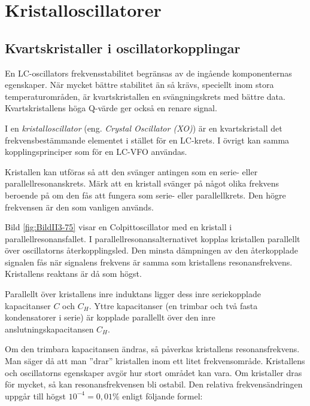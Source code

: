 \section{Kristalloscillatorer}

\subsection{Kvartskristaller i oscillator\-kopplingar}

En LC-oscillators frekvensstabilitet begränsas av de ingående
komponenternas egenskaper.
När mycket bättre stabilitet än så krävs, speciellt inom stora
temperaturområden, är kvartskristallen en svängningskrets med bättre data.
Kvartskristallens höga Q-värde ger också en renare signal.


I en \emph{kristalloscillator} (eng. \emph{Crystal Oscillator (XO)}) är en
kvartskristall det frekvensbestämmande elementet i stället för en LC-krets.
I övrigt kan samma kopplingsprinciper som för en LC-VFO användas.

Kristallen kan utföras så att den svänger antingen som en serie- eller
parallellresonanskrets.
Märk att en kristall svänger på något olika frekvens beroende på om den fås
att fungera som serie- eller parallellkrets.
Den högre frekvensen är den som vanligen används.

Bild \ref{fig:BildII3-75} visar en Colpittoscillator med en kristall i
parallellresonansfallet.
I parallellresonansalternativet kopplas kristallen parallellt över
oscillatorns återkopplingsled.
Den minsta dämpningen av den återkopplade signalen fås när signalens frekvens
är samma som kristallens resonansfrekvens.
Kristallens reaktans är då som högst.

Parallellt över kristallens inre induktans ligger dess inre
seriekopplade kapacitanser \(C\) och \(C_H\).
Yttre kapacitanser (en trimbar och två fasta kondensatorer i serie) är kopplade
parallellt över den inre anslutningskapacitansen \(C_H\).

Om den trimbara kapacitansen ändras, så påverkas kristallens resonansfrekvens.
Man säger då att man ''drar'' kristallen inom ett litet frekvensområde.
Kristallens och oscillatorns egenskaper avgör hur stort området kan vara.
Om kristaller dras för mycket, så kan resonansfrekvensen bli ostabil.
Den relativa frekvensändringen uppgår till högst \(10^{-4} = 0,01\%\)
enligt följande formel:

